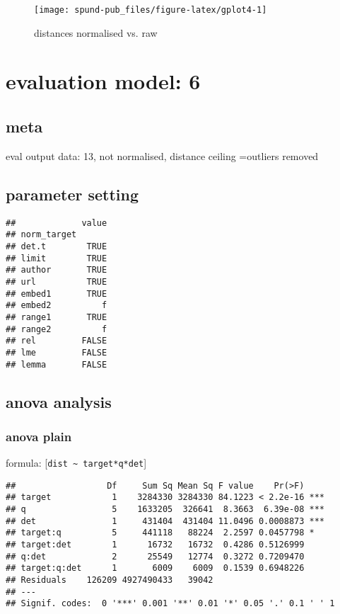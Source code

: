 \documentclass[
  12pt,
  oneside]{book}
\begin{document}
\begin{figure}[H]
\texttt{[image: spund-pub\_files/figure-latex/gplot4-1]} \caption{distances normalised vs. raw}\label{fig:gplot4}
\end{figure}

\section{evaluation model: 6}\label{evaluation-model-6}

\subsection{meta}\label{meta-4}

eval output data: 13, not normalised, distance ceiling =outliers removed

\subsection{parameter setting}\label{parameter-setting-4}

\begin{verbatim}
##             value
## norm_target      
## det.t        TRUE
## limit        TRUE
## author       TRUE
## url          TRUE
## embed1       TRUE
## embed2          f
## range1       TRUE
## range2          f
## rel         FALSE
## lme         FALSE
## lemma       FALSE
\end{verbatim}

\subsection{anova analysis}\label{anova-analysis-4}

\subsubsection{anova plain}\label{anova-plain-4}

formula: {[}\texttt{dist\ \textasciitilde{}\ target*q*det}{]}

\begin{verbatim}
##                  Df     Sum Sq Mean Sq F value    Pr(>F)    
## target            1    3284330 3284330 84.1223 < 2.2e-16 ***
## q                 5    1633205  326641  8.3663  6.39e-08 ***
## det               1     431404  431404 11.0496 0.0008873 ***
## target:q          5     441118   88224  2.2597 0.0457798 *  
## target:det        1      16732   16732  0.4286 0.5126999    
## q:det             2      25549   12774  0.3272 0.7209470    
## target:q:det      1       6009    6009  0.1539 0.6948226    
## Residuals    126209 4927490433   39042                      
## ---
## Signif. codes:  0 '***' 0.001 '**' 0.01 '*' 0.05 '.' 0.1 ' ' 1
\end{verbatim}
\end{document}
